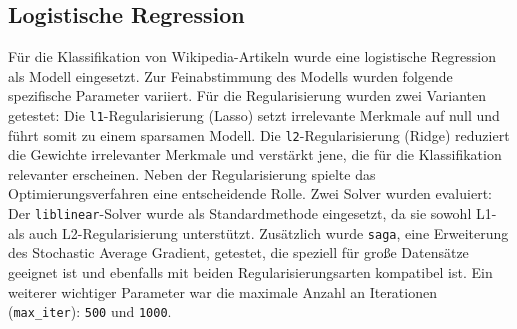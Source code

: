 \subsection{Logistische Regression}

Für die Klassifikation von Wikipedia-Artikeln wurde eine logistische Regression als Modell eingesetzt. Zur Feinabstimmung des Modells wurden folgende spezifische Parameter variiert. Für die Regularisierung wurden zwei Varianten getestet: Die \texttt{l1}-Regularisierung (Lasso) setzt irrelevante Merkmale auf null und führt somit zu einem sparsamen Modell. Die \texttt{l2}-Regularisierung (Ridge) reduziert die Gewichte irrelevanter Merkmale und verstärkt jene, die für die Klassifikation relevanter erscheinen. Neben der Regularisierung spielte das Optimierungsverfahren eine entscheidende Rolle. Zwei Solver wurden evaluiert: Der \texttt{liblinear}-Solver wurde als Standardmethode eingesetzt, da sie sowohl L1- als auch L2-Regularisierung unterstützt. Zusätzlich wurde \texttt{saga}, eine Erweiterung des Stochastic Average Gradient, getestet, die speziell für große Datensätze geeignet ist und ebenfalls mit beiden Regularisierungsarten kompatibel ist.
Ein weiterer wichtiger Parameter war die maximale Anzahl an Iterationen (\texttt{max\_iter}): \texttt{500} und \texttt{1000}.
